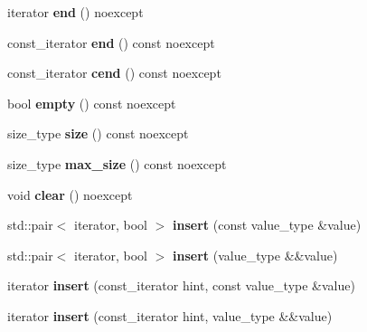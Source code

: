 \begin{DoxyCompactItemize}
iterator {\bfseries end} () noexcept
\item 
\mbox{\label{classtsl_1_1robin__set_aa9a2001228afe69773cecb2dc41d2c7e}} 
const\+\_\+iterator {\bfseries end} () const noexcept
\item 
\mbox{\label{classtsl_1_1robin__set_a9b12618040e15dd9eecd3bdd4a6e678f}} 
const\+\_\+iterator {\bfseries cend} () const noexcept
\item 
\mbox{\label{classtsl_1_1robin__set_a2b8925720dcc1fb35592812c2ecb533d}} 
bool {\bfseries empty} () const noexcept
\item 
\mbox{\label{classtsl_1_1robin__set_af7b7677dfd5e8c53af40cfdc0c9879f3}} 
size\+\_\+type {\bfseries size} () const noexcept
\item 
\mbox{\label{classtsl_1_1robin__set_a3c76037a81ef5125732551510a72aac2}} 
size\+\_\+type {\bfseries max\+\_\+size} () const noexcept
\item 
\mbox{\label{classtsl_1_1robin__set_af09c6123a04d2bfdf3b8005ac1d63d4f}} 
void {\bfseries clear} () noexcept
\item 
\mbox{\label{classtsl_1_1robin__set_aec5148db14516e0025f7a791e98f770e}} 
std\+::pair$<$ iterator, bool $>$ {\bfseries insert} (const value\+\_\+type \&value)
\item 
\mbox{\label{classtsl_1_1robin__set_aea6b9eb40065766503f642bdc24807d9}} 
std\+::pair$<$ iterator, bool $>$ {\bfseries insert} (value\+\_\+type \&\&value)
\item 
\mbox{\label{classtsl_1_1robin__set_a37befa5831834dbc09c1f863643c5cb0}} 
iterator {\bfseries insert} (const\+\_\+iterator hint, const value\+\_\+type \&value)
\item 
\mbox{\label{classtsl_1_1robin__set_a3fa90cb08e8ab9e489fa58ae094b02ff}} 
iterator {\bfseries insert} (const\+\_\+iterator hint, value\+\_\+type \&\&value)
\item 

\end{DoxyCompactItemize}

